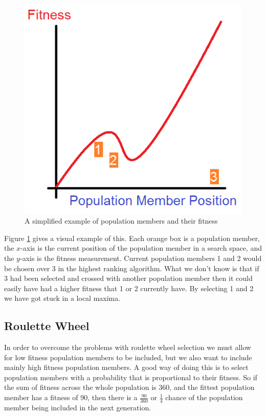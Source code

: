 \documentclass[]{report}
\begin{document}
\begin{figure}
	\centering
	\includegraphics[scale=0.4]{figures/highestRanking.png}
	\caption{A simplified example of population members and their fitness}
	\label{highestRankingProblem}
\end{figure}

Figure \ref{highestRankingProblem} gives a visual example of this. Each orange box is a population member, the $x$-axis is the current position of the population member in a search space, and the $y$-axis is the fitness measurement. Current population members 1 and 2 would be chosen over 3 in the highest ranking algorithm. What we don't know is that if 3 had been selected and crossed with another population member then it could easily have had a higher fitness that 1 or 2 currently have. By selecting 1 and 2 we have got stuck in a local maxima.

\subsection{Roulette Wheel}

In order to overcome the problems with roulette wheel selection we must allow for low fitness population members to be included, but we also want to include mainly high fitness population members. A good way of doing this is to select population members with a probability that is proportional to their fitness. So if the sum of fitness across the whole population is 360, and the fittest population member has a fitness of 90, then there is a $\frac{90}{360}$ or $\frac{1}{4}$ chance of the population member being included in the next generation.\\
\end{document}
